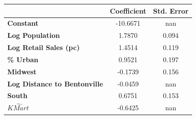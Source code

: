 \begin{center}
\begin{tabular}{lcc}
                                & \textbf{Coefficient} & \textbf{Std. Error}\\
\midrule
\textbf{Constant}                      &     -10.6671  &          nan     \\
\textbf{Log Population}              &       1.7870  &        0.094     \\
\textbf{Log Retail Sales (pc)}      &       1.4514  &        0.119     \\
\textbf{\% Urban}                   &       0.9521  &        0.197     \\
\textbf{Midwest}                    &      -0.1739  &        0.156     \\
\textbf{Log Distance to Bentonville} &      -0.0459  &          nan     \\
\textbf{South}                      &       0.6751  &        0.153     \\
  \textbf{$\hat{KMart}$}                      &      -0.6425  &          nan     \\
\bottomrule
\end{tabular}
\end{center}
